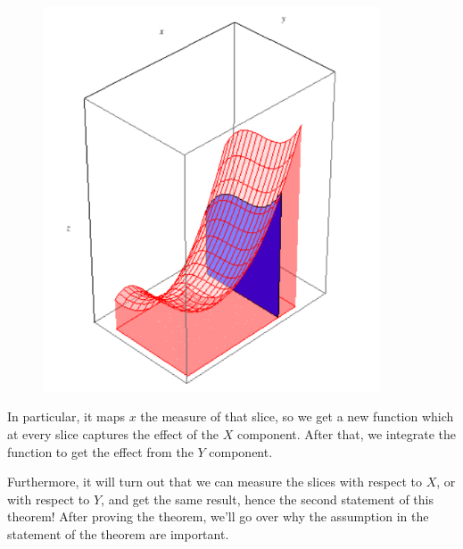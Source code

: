 \documentclass[oneside]{book}
\begin{document}
\begin{figure}[H]
	\centering
	\includegraphics[width=10cm]{FubiniTonelli}
\end{figure}

In particular, it maps $x$ the measure of that slice, so we get a new function which at every slice captures the effect
of the $X$ component. After that, we integrate the function to get the effect from the $Y$ component. 

Furthermore, it will turn out that we can measure the slices with respect to $X$, or with respect to $Y$, and get the
same result, hence the second statement of this theorem! After proving the theorem, we'll go over why the assumption in
the statement of the theorem are important.
\end{document}
